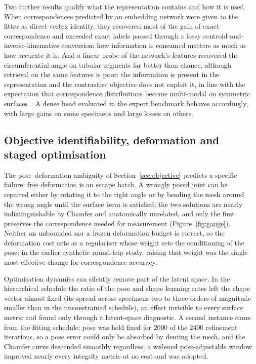 Two further results qualify what the representation contains and how it is used.
When correspondences predicted by an embedding network were given to the fitter as
direct vertex identity, they recovered most of the gain of exact correspondence and
exceeded exact labels passed through a lossy centroid-and-inverse-kinematics
conversion: how information is consumed matters as much as how accurate it is. And a
linear probe of the network's features recovered the circumferential angle on tubular
segments far better than chance, although retrieval on the same features is poor:
the information is present in the representation and the contrastive objective does
not exploit it, in line with the expectation that correspondence distributions become
multi-modal on symmetric surfaces~\cite{haugaard}. A dense head evaluated in the
expert benchmark behaves accordingly, with large gains on some specimens and large
losses on others.

\subsection{Objective identifiability, deformation and staged optimisation}
\label{sec:identifiability}

The pose--deformation ambiguity of Section~\ref{sec:objective} predicts a specific
failure: free deformation is an escape hatch. A wrongly posed joint can be repaired
either by rotating it to the right angle or by bending the mesh around the wrong
angle until the surface term is satisfied; the two solutions are nearly
indistinguishable by Chamfer and anatomically unrelated, and only the first preserves
the correspondence needed for measurement (Figure~\ref{fig:gauge}). Neither an unbounded nor a frozen deformation budget is correct, so the
deformation cost acts as a regulariser whose weight sets the conditioning of the
pose; in the earlier synthetic round-trip study, raising that weight was the single most
effective change for correspondence accuracy.

Optimisation dynamics can silently remove part of the latent space. In the
hierarchical schedule the ratio of the pose and shape learning rates left the shape
vector almost fixed (its spread across specimens two to three orders of magnitude
smaller than in the unconstrained schedule), an effect invisible to every surface
metric and found only through a latent-space diagnostic. A second instance came from
the fitting schedule: pose was held fixed for $2000$ of the $2400$ refinement
iterations, so a pose error could only be absorbed by denting the mesh, and the
Chamfer curve descended smoothly regardless; a widened pose-adjustable window
improved nearly every integrity metric at no cost and was adopted.

